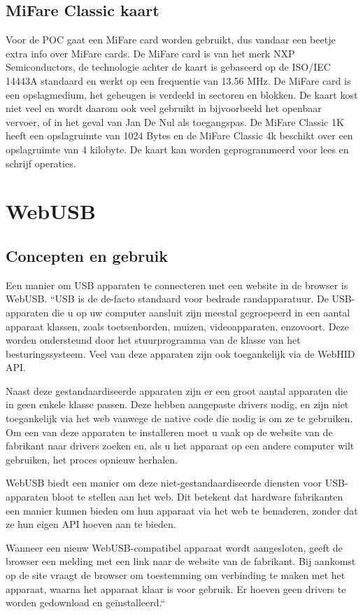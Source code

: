 \subsection{MiFare Classic kaart}
Voor de POC gaat een MiFare card worden gebruikt, dus vandaar een beetje extra info over MiFare cards.
De MiFare card is van het merk NXP Semiconductors, de technologie achter de kaart is gebaseerd op de ISO/IEC 14443A standaard en werkt op een frequentie van 13.56 MHz. De MiFare card is een opslagmedium, het geheugen is verdeeld in sectoren en blokken. De kaart kost niet veel en wordt daarom ook veel gebruikt in bijvoorbeeld het openbaar vervoer, of in het geval van Jan De Nul als toegangspas.
De MiFare Classic 1K heeft een opslagruimte van 1024 Bytes en de MiFare Classic 4k beschikt over een opslagruimte van 4 kilobyte. De kaart kan worden geprogrammeerd voor lees en schrijf operaties.


\section{WebUSB}
\subsection{Concepten en gebruik}
Een manier om USB apparaten te connecteren met een website in de browser is WebUSB.
``USB is de de-facto standaard voor bedrade randapparatuur. De USB-apparaten die u op uw computer aansluit zijn meestal gegroepeerd in een aantal apparaat klassen, zoals toetsenborden, muizen, videoapparaten, enzovoort. Deze worden ondersteund door het stuurprogramma van de klasse van het besturingssysteem. Veel van deze apparaten zijn ook toegankelijk via de WebHID API.

Naast deze gestandaardiseerde apparaten zijn er een groot aantal apparaten die in geen enkele klasse passen. Deze hebben aangepaste drivers nodig, en zijn niet toegankelijk via het web vanwege de native code die nodig is om ze te gebruiken. Om een van deze apparaten te installeren moet u vaak op de website van de fabrikant naar drivers zoeken en, als u het apparaat op een andere computer wilt gebruiken, het proces opnieuw herhalen.

WebUSB biedt een manier om deze niet-gestandaardiseerde diensten voor USB-apparaten bloot te stellen aan het web. Dit betekent dat hardware fabrikanten een manier kunnen bieden om hun apparaat via het web te benaderen, zonder dat ze hun eigen API hoeven aan te bieden.

Wanneer een nieuw WebUSB-compatibel apparaat wordt aangesloten, geeft de browser een melding met een link naar de website van de fabrikant. Bij aankomst op de site vraagt de browser om toestemming om verbinding te maken met het apparaat, waarna het apparaat klaar is voor gebruik. Er hoeven geen drivers te worden gedownload en geïnstalleerd.``

